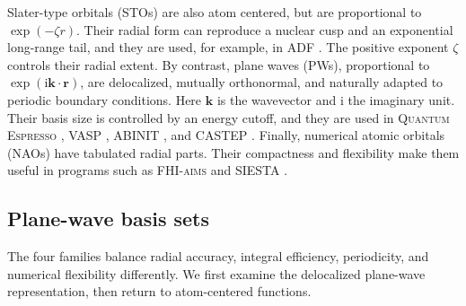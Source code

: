 \documentclass[11pt,a4paper,titlepage]{article}
\numberwithin{equation}{section}
\newcommand{\bk}{\boldsymbol{k}}
\newcommand{\br}{\boldsymbol{r}}
\newcommand{\ii}{\mathrm{i}}
\begin{document}
Slater-type orbitals (STOs) are also atom centered, but are
proportional to $\exp(-\zeta r)$. Their radial form can reproduce a nuclear
cusp and an exponential long-range tail, and they are used, for example, in
\textsc{ADF} \citep{ADF2001}. The positive exponent $\zeta$ controls their radial extent.
By contrast,
plane waves (PWs), proportional to $\exp(\ii\bk\cdot\br)$, are
delocalized, mutually orthonormal, and naturally adapted to periodic boundary
conditions. Here $\bk$ is the wavevector and $\ii$ the imaginary unit.
Their basis size is controlled by an energy cutoff, and they are
used in \textsc{Quantum Espresso} \citep{QuantumEspresso2009},
\textsc{VASP} \citep{VASP1996}, \textsc{ABINIT} \citep{ABINIT2020}, and
\textsc{CASTEP} \citep{CASTEP2005}. Finally, numerical atomic orbitals (NAOs) have
tabulated radial parts. Their compactness and flexibility make them useful in
programs such as \textsc{FHI-aims} \citep{FHIAims2009} and
\textsc{SIESTA} \citep{SIESTA2002}.

\subsection{Plane-wave basis sets}

The four families balance radial accuracy, integral efficiency, periodicity,
and numerical flexibility differently. We first examine the delocalized
plane-wave representation, then return to atom-centered functions.
\end{document}
